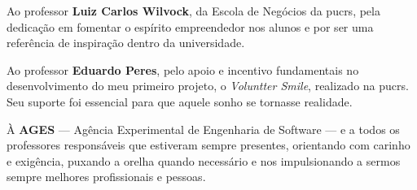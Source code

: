 \begin{agradecimentos}

Ao professor \textbf{Luiz Carlos Wilvock}, da Escola de Negócios da \ac{pucrs},
pela dedicação em fomentar o espírito empreendedor nos alunos e por ser uma
referência de inspiração dentro da universidade.

Ao professor \textbf{Eduardo Peres}, pelo apoio e incentivo fundamentais no
desenvolvimento do meu primeiro projeto, o \textit{Voluntter Smile}, realizado
na \ac{pucrs}. Seu suporte foi essencial para que aquele sonho se tornasse realidade.

À \textbf{AGES} — Agência Experimental de Engenharia de Software — e a todos
os professores responsáveis que estiveram sempre presentes, orientando com
carinho e exigência, puxando a orelha quando necessário e nos impulsionando a
sermos sempre melhores profissionais e pessoas.

\vfill
\end{agradecimentos}